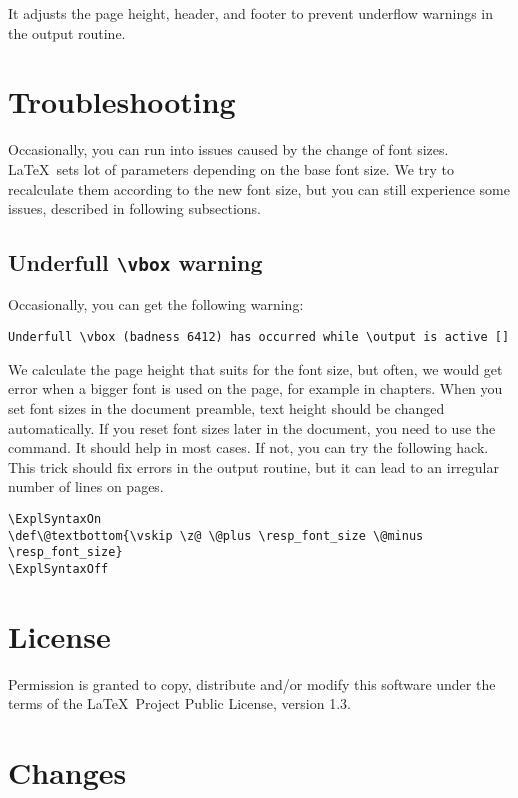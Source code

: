 \documentclass{ltxdoc}
\begin{document}
\noindent It adjusts the page height, header, and footer to prevent underflow
\cmd{\vbox} warnings in the output routine.



\section{Troubleshooting}

Occasionally, you can run into issues caused by the change of font sizes. \LaTeX\ sets lot of parameters 
depending on the base font size. We try to recalculate them according to the new font size, but you can still
experience some issues, described in following subsections.

\subsection{Underfull \texttt{\textbackslash vbox} warning}

Occasionally, you can get the following warning:

\begin{verbatim}
Underfull \vbox (badness 6412) has occurred while \output is active []
\end{verbatim}

We calculate the page height that suits  for the font size, but often,
we would get error when a bigger font is used on the page,
for example in chapters. When you set font sizes in the document preamble,
text height should be changed automatically. If you reset font sizes later in the
document, you need to use the \cmd{\fixtextheight} command. It should help in
most cases. If not, you can try the following hack.
This trick should fix \cmd{\vbox} errors in the output routine, but it can lead 
to an irregular number of lines on pages.


\begin{verbatim}
\ExplSyntaxOn
\def\@textbottom{\vskip \z@ \@plus \resp_font_size \@minus \resp_font_size}
\ExplSyntaxOff
\end{verbatim}

\section{License}

Permission is granted to copy, distribute and/or modify this software
under the terms of the \LaTeX\ Project Public License, version 1.3.


\section{Changes}
\end{document}
